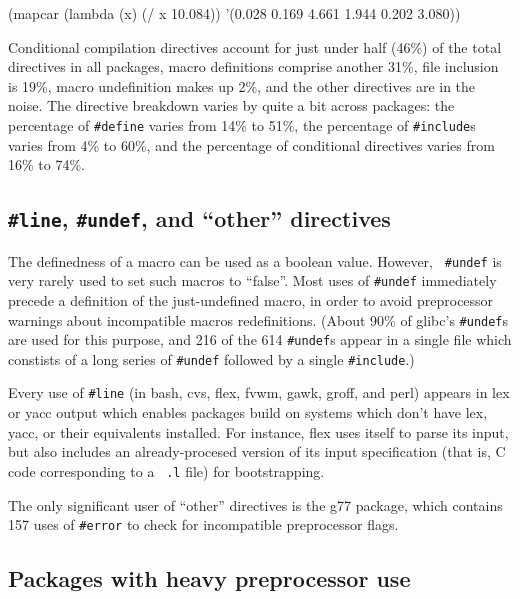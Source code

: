 \documentclass[11pt]{article}
\begin{document}

(mapcar (lambda (x) (/ x 10.084)) '(0.028 0.169 4.661 1.944 0.202 3.080))

Conditional compilation directives account for just under half (46\%) of
the total directives in all packages, macro definitions comprise another
31\%, file inclusion is 19\%, macro undefinition makes up 2\%, and the
other directives are in the noise.  The directive breakdown varies by quite
a bit across packages: the percentage of {\tt \#define} varies from 14\% to
51\%, the percentage of {\tt \#include}s varies from 4\% to 60\%, and the
percentage of conditional directives varies from 16\% to 74\%.



\subsection{{\tt \#line}, {\tt \#undef}, and ``other'' directives}

The definedness of a macro can be used as a boolean value.  However, {\tt
\#undef} is very rarely used to set
such macros to ``false''.  Most uses of {\tt \#undef} immediately precede a
definition of the just-undefined macro, in order to avoid preprocessor
warnings about incompatible macros redefinitions.  (About 90\% of glibc's
{\tt \#undef}s are used for this purpose, and 216 of the 614 {\tt \#undef}s
appear in a single file which constists of a long series of {\tt \#undef}
followed by a single {\tt \#include}.)

Every use of {\tt \#line} (in bash, cvs, flex, fvwm, gawk, groff, and perl)
appears in lex or yacc output which enables packages build on systems which
don't have lex, yacc, or their equivalents installed.  For instance, flex
uses itself to parse its input, but also includes an already-procesed
version of its input specification (that is, C code corresponding to a {\tt
.l} file) for bootstrapping.

The only significant user of ``other'' directives is the g77 package, which
contains 157 uses of {\tt \#error} to check for incompatible preprocessor
flags.


\subsection{Packages with heavy preprocessor use}
\end{document}
